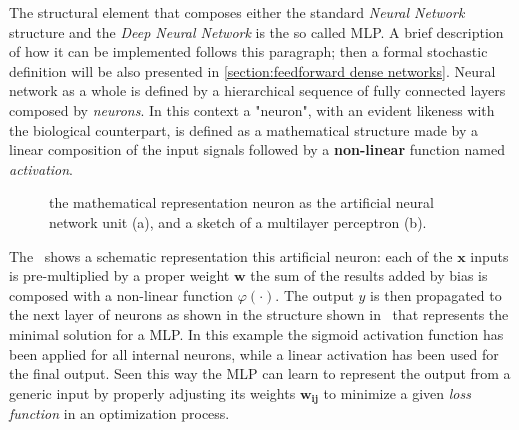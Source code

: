 The structural element that composes either the standard \textit{Neural Network} structure and the \textit{Deep Neural Network} is the so called \acl{MLP}. A brief description of how it can be implemented follows this paragraph; then a formal stochastic definition will be also presented in \cref{section:feedforward dense networks}. 
Neural network as a whole is defined by a hierarchical sequence of fully connected layers composed by \textit{neurons}. In this context a "neuron", with an evident likeness with the biological counterpart, is defined as a mathematical structure made by a  linear composition of the input signals followed by a \textbf{non-linear} function named \textit{activation}.
\begin{figure}
    \centering
    \caption{the mathematical representation neuron as the artificial neural network unit (a), and a sketch of a multilayer perceptron (b).}
    \label{fig:mlp}
\end{figure}
The~\Figure{\ref{fig:mlp_a}} shows a schematic representation this artificial neuron: each of the $\bm{x}$ inputs is pre-multiplied by a proper weight $\bm{w}$ the sum of the results added by bias is composed with a non-linear function $\varphi(\cdot)$. The output $y$ is then propagated to the next layer of neurons as shown in the structure shown in~\Figure{\ref{fig:mlp_b}} that represents the minimal solution for a \acs{MLP}. In this example the sigmoid activation function has been applied for all internal neurons, while a linear activation has been used for the final output.
Seen this way the \acs{MLP} can learn to represent the output from a generic input by properly adjusting its weights $\bm{w_{ij}}$ to minimize a given \textit{loss function} in an optimization process.

